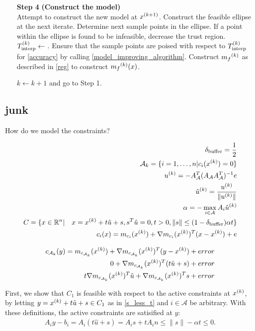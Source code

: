 \begin{algorithm}[H]
\begin{itemize}
        \item[\textbf{Step 4}] \textbf{(Construct the model)} \\
            Attempt to construct the new model at ${x}^{(k+1)}$.
            Construct the feasible ellipse at the next iterate.
            Determine next sample points in the ellipse.
            If a point within the ellipse is found to be infeasible, decrease the trust region.
            $ {T_{\text{interp}}^{(k)}} \gets $ .
            Ensure that the sample points are poised with respect to $ {T_{\text{interp}}^{(k)}} $ for \cref{accuracy} by calling \cref{model_improving_algorithm}.
            Construct ${{m}_f}^{(k)}$ as described in \cref{reg} to construct ${{m}_f}^{(k)}(x)$.
            
        $k \gets k+1$ and go to Step 1.
    \end{itemize}
\end{algorithm}





\subsection{junk}

How do we model the constraints?

\begin{align*}
{\delta_{\text{buffer}}} = \frac 1 2 \\
\mathcal A_k = \{i =  1,\ldots, n| c_i({x^{(k)}}) = 0\} \\
u^{(k)} = -A_{\mathcal A}^T(A_{\mathcal A}A_{\mathcal A}^T)^{-1} e\\
\hat u^{(k)} = \frac {u^{(k)}} {\| u^{(k)}\|}\\
\alpha = -\max_{i \in \mathcal A} A_i \hat u^{(k)} \\
C = \{x \in \mathbb R^n | \quad x = {x^{(k)}} + t\hat u + s, s^T\hat u = 0, t > 0, \|s\| \le (1 - {\delta_{\text{buffer}}})\alpha t\} \\
c_i(x) = m_{c_i}({x^{(k)}}) + \nabla m_{c_i}({x^{(k)}})^T(x - {x^{(k)}}) + e \\
\end{align*}

\begin{align*}
c_{\mathcal A_k} (y) = m_{c_{\mathcal A_k}}({x^{(k)}}) + \nabla m_{c_{\mathcal A_k}}({x^{(k)}})^T(y - {x^{(k)}}) + error \\
0 + \nabla m_{c_{\mathcal A_k}}({x^{(k)}})^T(t\hat u + s) + error \\
t \nabla m_{c_{\mathcal A_k}}({x^{(k)}})^T\hat u + \nabla m_{c_{\mathcal A_k}}({x^{(k)}})^Ts + error \\
\end{align*}


First, we show that $C_1$ is feasible with respect to the active constraints at ${x^{(k)}}$,
by letting $y = {x^{(k)}} + t\hat u + s\in C_1$ as in \ref{s_less_t} and $i \in \mathcal A$ be arbitrary.
With these definitions, the active constraints are satisified at $y$:
\begin{align*}
A_{i}y - b_{i} = A_{i}(t\hat u + s) = A_{i}s + t A_{i}n \le \|s\| - \alpha t \le 0.
\end{align*}


